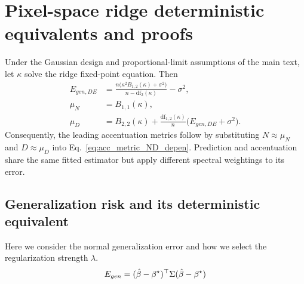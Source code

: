 \section{Pixel-space ridge deterministic equivalents and proofs}\label{sec:app-pixel-ridge}

\begingroup\color{red}
\begin{proposition}
\label{prop:app-pixel-ridge-de}
Under the Gaussian design and proportional-limit assumptions of the main
text, let $\kappa$ solve the ridge fixed-point equation.  Then
\begin{align}
E_{gen,DE}
&=\frac{n\bigl(\kappa^2B_{1,2}(\kappa)+\sigma^2\bigr)}
        {n-\mathrm{df}_{2}(\kappa)}-\sigma^2,
\label{eq:app-pixel-egen-summary}\\
\mu_N
&=B_{1,1}(\kappa),
\label{eq:app-pixel-N-summary}\\
\mu_D
&=B_{2,2}(\kappa)
 +\frac{\mathrm{df}_{1,2}(\kappa)}{n}
  \bigl(E_{gen,DE}+\sigma^2\bigr).
\label{eq:app-pixel-D-summary}
\end{align}
Consequently, the leading accentuation metrics follow by substituting
$N\approx\mu_N$ and $D\approx\mu_D$ into
Eq.~\ref{eq:acc_metric_ND_depen}.  Prediction and accentuation share the
same fitted estimator but apply different spectral weightings to its error.
\end{proposition}
\endgroup

\subsection{Generalization risk and its deterministic equivalent}

Here we consider the normal generalization error and how we select
the regularization strength $\lambda$.
\[
E_{gen}=(\hat{\beta}-{\beta^{\star}})^{\top}\Sigma(\hat{\beta}-{\beta^{\star}})
\]

